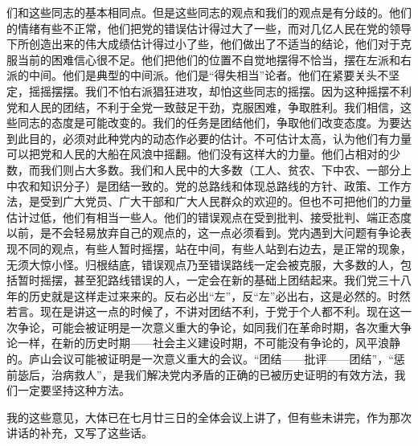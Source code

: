 们和这些同志的基本相同点。但是这些同志的观点和我们的观点是有分歧的。他们的情绪有些不正常，他们把党的错误估计得过大了一些，而对几亿人民在党的领导下所创造出来的伟大成绩估计得过小了些，他们做出了不适当的结论，他们对于克服当前的困难信心很不足。他们把他们的位置不自觉地摆得不恰当，摆在左派和右派的中间。他们是典型的中间派。他们是“得失相当”论者。他们在紧要关头不坚定，摇摇摆摆。我们不怕右派猖狂进攻，却怕这些同志的摇摆。因为这种摇摆不利党和人民的团结，不利于全党一致鼓足干劲，克服困难，争取胜利。我们相信，这些同志的态度是可能改变的。我们的任务是团结他们，争取他们改变态度。为要达到此目的，必须对此种党内的动态作必要的估计。不可估计太高，认为他们有力量可以把党和人民的大船在风浪中摇翻。他们没有这样大的力量。他们占相对的少数，而我们则占大多数。我们和人民中的大多数（工人、贫农、下中农、一部分上中农和知识分子）是团结一致的。党的总路线和体现总路线的方针、政策、工作方法，是受到广大党员、广大干部和广大人民群众的欢迎的。但也不可把他们的力量估计过低，他们有相当一些人。他们的错误观点在受到批判、接受批判、端正态度以前，是不会轻易放弃自己的观点的，这一点必须看到。党内遇到大问题有争论表现不同的观点，有些人暂时摇摆，站在中间，有些人站到右边去，是正常的现象，无须大惊小怪。归根结底，错误观点乃至错误路线一定会被克服，大多数的人，包括暂时摇摆，甚至犯路线错误的人，一定会在新的基础上团结起来。我们党三十八年的历史就是这样走过来来的。反右必出“左”，反“左”必出右，这是必然的。时然若言。现在是讲这一点的时候了，不讲对团结不利，于党于个人都不利。现在这一次争论，可能会被证明是一次意义重大的争论，如同我们在革命时期，各次重大争论一样，在新的历史时期——社会主义建设时期，不可能没有争论的，风平浪静的。庐山会议可能被证明是一次意义重大的会议。“团结——批评——团结”，“惩前毖后，治病救人”，是我们解决党内矛盾的正确的已被历史证明的有效方法，我们一定要坚持这种方法。

我的这些意见，大体已在七月廿三日的全体会议上讲了，但有些未讲完，作为那次讲话的补充，又写了这些话。


